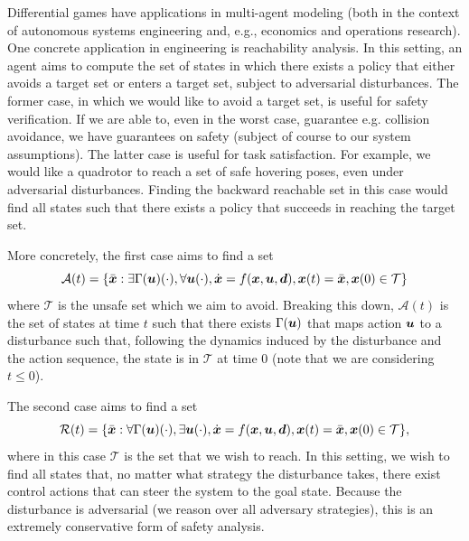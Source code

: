 Differential games have applications in multi-agent modeling (both in the context of autonomous systems engineering and, e.g., economics and operations research). One concrete application in engineering is reachability analysis. In this setting, an agent aims to compute the set of states in which there exists a policy that either avoids a target set or enters a target set, subject to adversarial disturbances. The former case, in which we would like to avoid a target set, is useful for safety verification. If we are able to, even in the worst case, guarantee e.g. collision avoidance, we have guarantees on safety (subject of course to our system assumptions). The latter case is useful for task satisfaction. For example, we would like a quadrotor to reach a set of safe hovering poses, even under adversarial disturbances. Finding the backward reachable set in this case would find all states such that there exists a policy that succeeds in reaching the target set. 

More concretely, the first case aims to find a set 
\begin{equation}
    \mathcal{A}(t) = \{\bar{\bm{x}} : \exists \Gamma(\bm{u})(\cdot), \forall \bm{u}(\cdot), \dot{\bm{x}} = f(\bm{x},\bm{u},\bm{d}), \bm{x}(t) = \bar{\bm{x}}, \bm{x}(0) \in \mathcal{T}\}
\end{equation}
where $\mathcal{T}$ is the unsafe set which we aim to avoid. Breaking this down, $\mathcal{A}(t)$ is the set of states at time $t$ such that there exists $\Gamma(\bm{u})$ that maps action $\bm{u}$ to a disturbance such that, following the dynamics induced by the disturbance and the action sequence, the state is in $\mathcal{T}$ at time $0$ (note that we are considering $t \leq 0$).

The second case aims to find a set 
\begin{equation}
\mathcal{R}(t) = \{\bar{\bm{x}} : \forall \Gamma(\bm{u})(\cdot), \exists \bm{u}(\cdot), \dot{\bm{x}} = f(\bm{x},\bm{u},\bm{d}), \bm{x}(t) = \bar{\bm{x}}, \bm{x}(0) \in \mathcal{T}\},
\end{equation}
where in this case $\mathcal{T}$ is the set that we wish to reach. In this setting, we wish to find all states that, no matter what strategy the disturbance takes, there exist control actions that can steer the system to the goal state. Because the disturbance is adversarial (we reason over all adversary strategies), this is an extremely conservative form of safety analysis. 

